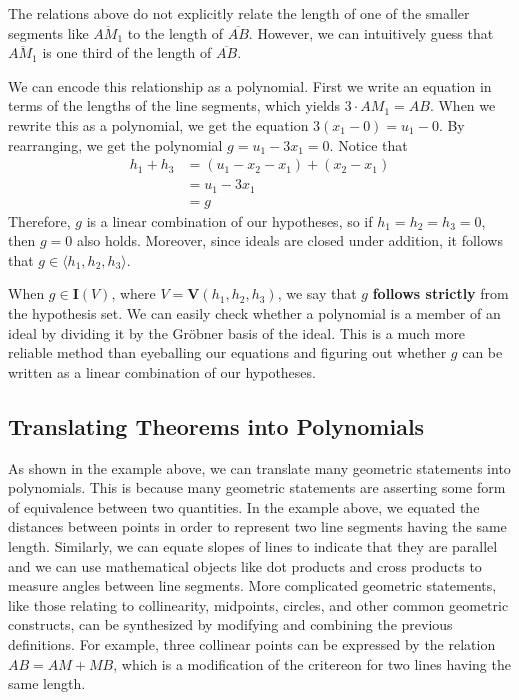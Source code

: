 \documentclass[12pt]{article}
\theoremstyle{plain}
\theoremstyle{definition}
\theoremstyle{remark}
\newcommand{\gro}{Gr\"obner }
\begin{document}
The relations above do not explicitly relate the length of one of the smaller segments like $\overline{AM_1}$ to the length of $\overline{AB}$. 
However, we can intuitively guess that $\overline{AM_1}$ is one third of the length of $\overline{AB}$. 

We can encode this relationship as a polynomial. First we write an equation in terms of the lengths of the line segments, which yields $3\cdot AM_1 = AB$.
When we rewrite this as a polynomial, we get the equation $3 (x_1 - 0) = u_1 - 0$. By rearranging, we get the polynomial $g = u_1 - 3x_1 = 0$.
Notice that
\begin{align*}
    h_1 + h_3 & = (u_1 - x_2 - x_1) + (x_2 - x_1)\\
              & = u_1 - 3x_1\\
              & = g
\end{align*}
Therefore, $g$ is a linear combination of our hypotheses, so if $h_1 = h_2 = h_3 = 0$, then $g = 0$ also holds.
Moreover, since ideals are closed under addition, it follows that $g \in \langle h_1,h_2,h_3 \rangle$.

When $g \in \textbf{I}(V)$, where $V = \textbf{V}(h_1,h_2,h_3)$, we say that $g$ \textbf{follows strictly} from the hypothesis set.
We can easily check whether a polynomial is a member of an ideal by dividing it by the \gro basis of the ideal.
This is a much more reliable method than eyeballing our equations and figuring out whether $g$ can be written as a linear combination of our hypotheses.

\subsection{Translating Theorems into Polynomials}
As shown in the example above, we can translate many geometric statements into polynomials. 
This is because many geometric statements are asserting some form of equivalence between two quantities.
In the example above, we equated the distances between points in order to represent two line segments having the same length.
Similarly, we can equate slopes of lines to indicate that they are parallel and we can use mathematical objects like dot products and cross products to measure angles between line segments.
More complicated geometric statements, like those relating to collinearity, midpoints, circles, and other common geometric constructs, 
can be synthesized by modifying and combining the previous definitions.
For example, three collinear points can be expressed by the relation $AB = AM + MB$, which is a modification of the critereon for two lines having the same length.
\end{document}
